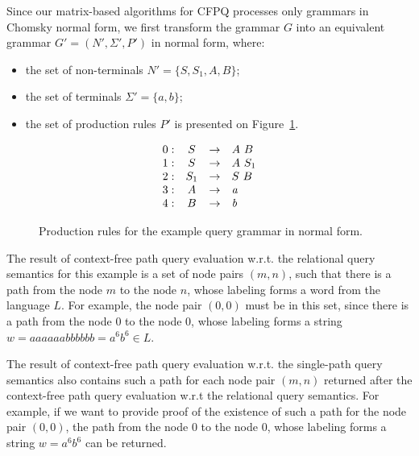 Since our matrix-based algorithms for CFPQ processes only grammars in Chomsky normal form, we first transform the grammar $G$ into an equivalent grammar $G' = (N', \Sigma', P')$ in normal form, where:
\begin{itemize}
	\item the set of non-terminals $N' = \{S, S_1, A, B\}$;
	\item the set of terminals $\Sigma' = \{a, b\}$;
	\item the set of production rules $P'$ is presented on Figure~\ref{ProductionRulesExampleQueryCNF}.
\end{itemize}

\begin{figure}[h]
	\[
	\begin{array}{rccl}
	0: & S & \rightarrow & A \ B \\
	1: & S & \rightarrow & A \ S_1 \\
	2: & S_1 & \rightarrow & S \ B \\
	3: & A & \rightarrow & \text{\emph{a}} \\ 
	4: & B & \rightarrow & \text{\emph{b}} \\ 
	\end{array}
	\]
	\caption{Production rules for the example query grammar in normal form.}
	\label{ProductionRulesExampleQueryCNF}
\end{figure}

The result of context-free path query evaluation w.r.t. the relational query semantics for this example is a set of node pairs \mbox{$(m, n)$}, such that there is a path from the node $m$ to the node $n$, whose labeling forms a word from the language $L$. For example, the node pair \mbox{$(0,0)$} must be in this set, since there is a path from the node $0$ to the node $0$, whose labeling forms a string \mbox{$w = aaaaaabbbbbb = a^6b^6 \in L$}.

The result of context-free path query evaluation w.r.t. the single-path query semantics also contains such a path for each node pair \mbox{$(m, n)$} returned after the context-free path query evaluation w.r.t the relational query semantics. For example, if we want to provide proof of the existence of such a path for the node pair \mbox{$(0,0)$}, the path from the node $0$ to the node $0$, whose labeling forms a string \mbox{$w = a^6b^6$} can be returned. 